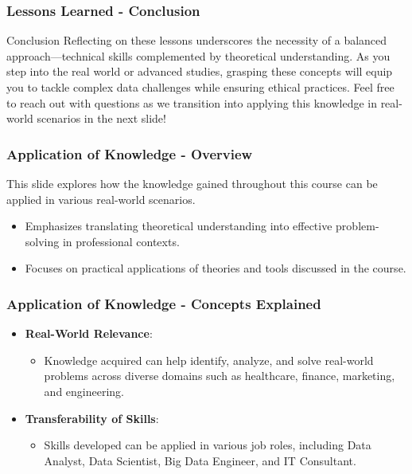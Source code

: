 \documentclass[aspectratio=169]{beamer}
\begin{document}
\begin{frame}[fragile]
    \frametitle{Lessons Learned - Conclusion}
    \begin{block}{Conclusion}
        Reflecting on these lessons underscores the necessity of a balanced approach—technical skills complemented by theoretical 
        understanding. As you step into the real world or advanced studies, grasping these concepts will equip you to tackle 
        complex data challenges while ensuring ethical practices. Feel free to reach out with questions as we transition into 
        applying this knowledge in real-world scenarios in the next slide!
    \end{block}
\end{frame}

\begin{frame}[fragile]
    \frametitle{Application of Knowledge - Overview}
    This slide explores how the knowledge gained throughout this course can be applied in various real-world scenarios. 

    \begin{itemize}
        \item Emphasizes translating theoretical understanding into effective problem-solving in professional contexts.
        \item Focuses on practical applications of theories and tools discussed in the course.
    \end{itemize}
\end{frame}

\begin{frame}[fragile]
    \frametitle{Application of Knowledge - Concepts Explained}
    \begin{itemize}
        \item \textbf{Real-World Relevance}:
            \begin{itemize}
                \item Knowledge acquired can help identify, analyze, and solve real-world problems across diverse domains such as healthcare, finance, marketing, and engineering.
            \end{itemize}
        
        \item \textbf{Transferability of Skills}:
            \begin{itemize}
                \item Skills developed can be applied in various job roles, including Data Analyst, Data Scientist, Big Data Engineer, and IT Consultant.
            \end{itemize}
    \end{itemize}
\end{frame}
\end{document}
